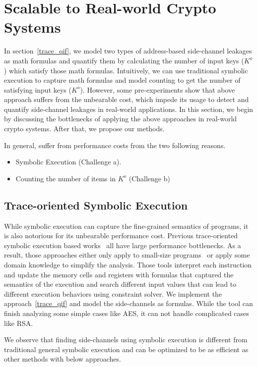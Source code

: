 \section{Scalable to Real-world Crypto Systems}

In section~\ref{trace_qif}, we model two types of address-based side-channel
leakages
as math formulas and quantify them by calculating the number of input
keys ($K^o$) which satisfy those math formulas. Intuitively, we can use
traditional symbolic execution to capture math formulas and model
counting to get the number of satisfying input keys ($K^o$).
However, some pre-experiments show that above approach suffers from the unbearable cost, 
which impede its usage
to detect and quantify side-channel leakages in real-world applications. 
In this section, we begin by discussing the bottlenecks of applying the 
above approaches in real-world crypto systems. After that, we propose
our methods.

In general, \tool suffer from performance costs
from the two following reasons. 
\begin{itemize}
    \item Symbolic Execution (Challenge a).
    \item Counting the number of items in $K^o$ (Challenge b)
\end{itemize}

\subsection{Trace-oriented Symbolic Execution}
While symbolic execution can capture the fine-grained semantics of programs,
it is also notorious for its unbearable performance cost. Previous 
trace-oriented symbolic execution based
works~\cite{203878,Chattopadhyay:2017:QIL:3127041.3127044} all 
have large performance bottlenecks. As a result, those approaches 
either only apply to small-size programs~\cite{Chattopadhyay:2017:QIL:3127041.3127044} 
or apply some domain knowledge to simplify the analysis.
Those tools interpret each instruction and update the memory cells and registers with
formulas that captured the semantics of the execution and search different 
input values that can lead to different execution behaviors using constraint solver.
We implement the approach~\ref{trace_qif} and model the side-channels as formulas.
While the tool can finish analyzing some simple cases like AES, 
it can not handle complicated cases like RSA. 

We observe that finding side-channels using symbolic execution is different from 
traditional general symbolic execution and can be optimized to be as efficient as other
methods with below approaches.

